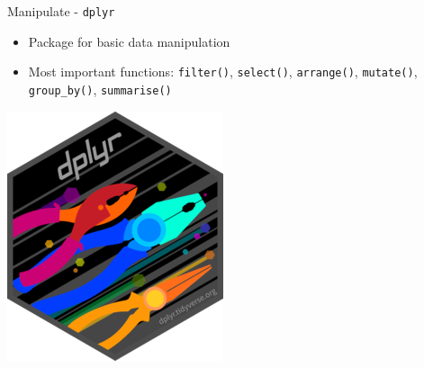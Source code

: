 \documentclass[
  ignorenonframetext,
]{beamer}
\providecommand{\tightlist}{%
  \setlength{\itemsep}{0pt}\setlength{\parskip}{0pt}}
\begin{document}
\begin{frame}[fragile]{Manipulate - \texttt{dplyr}}
\protect\hypertarget{manipulate---dplyr}{}
\begin{itemize}
\tightlist
\item
  Package for basic data manipulation
\item
  Most important functions: \texttt{filter()}, \texttt{select()},
  \texttt{arrange()}, \texttt{mutate()}, \texttt{group\_by()},
  \texttt{summarise()}
\end{itemize}

\includegraphics[width=0.95\linewidth,height=0.95\textheight]{images/dplyr_logo}
\end{frame}
\end{document}
